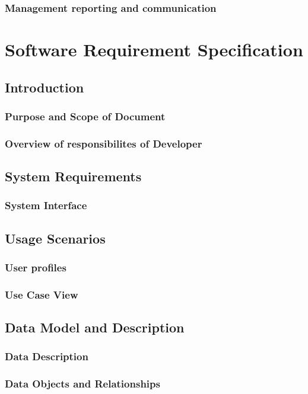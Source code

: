 \documentclass[a4paper, oneside, 12pt]{book}
\begin{document}
			\subsubsection{Management reporting and communication}
	\newpage
	\section{Software Requirement Specification}
	\newpage
		\subsection{Introduction}
			\subsubsection{Purpose and Scope of Document}
			\subsubsection{Overview of responsibilites of Developer}
		\subsection{System Requirements}
			\subsubsection{System Interface}
		\subsection{Usage Scenarios}
			\subsubsection{User profiles}
			\subsubsection{Use Case View}
		\subsection{Data Model and Description}
			\subsubsection{Data Description}
			\subsubsection{Data Objects and Relationships}
\end{document}
